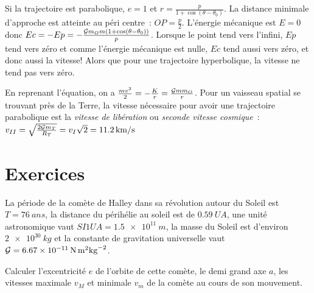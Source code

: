 Si la trajectoire est parabolique, \(e=1\) et \(r =
\frac{p}{1+\cos(\theta-\theta_0)}\). La distance minimale d'approche est %
atteinte au péri centre~: \(OP = \frac{p}{2}\). L'énergie mécanique est \(E=0\)
donc \(Ec = -Ep = -\frac{\mathcal{G} m_O m(1+\cos(\theta - \theta_0))}{p}\). Lorsque le
point tend vers l'infini, \(Ep\) tend vers zéro et comme l'énergie mécanique
est nulle, \(Ec\) tend aussi vers zéro, et donc aussi la vitesse!
Alors que pour une trajectoire hyperbolique, la vitesse ne tend pas vers zéro.

En reprenant l'équation, on a \(\frac{mv^2}{2} = -\frac{K}{r} = \frac{\mathcal{G} m
m_O}{r}\). Pour un vaisseau spatial se trouvant près de la Terre, la vitesse
nécessaire pour avoir une trajectoire parabolique est la \emph{vitesse de
libération} ou \emph{seconde vitesse cosmique}~: \(v_{II} = \sqrt{\frac{2\mathcal{G}
m_T}{R_T}} = v_{I} \sqrt{2} = \qty{11.2}{km/s}\)

\clearpage
\section{Exercices}%
\begin{exercice}%
  La période de la comète de Halley dans sa révolution autour du Soleil est \(T
  = \SI{76}{ans}\), la distance du périhélie au soleil est de
  \(\SI{0.59}{UA}\), une unité astronomique vaut \(SI{1}{UA} =
  \SI{1.5e11}{m}\), la masse du Soleil est d'environ \(\SI{2e30}{kg}\) et la
  constante de gravitation universelle vaut \(\mathcal{G} =
  \SI{6.67e-11}{N.m^2kg^{-2}}\).

  Calculer l'excentricité \(e\) de l'orbite de cette comète, le demi grand axe
  \(a\), les vitesses maximale \(v_M\) et minimale \(v_m\) de la comète au
  cours de son mouvement.
\end{exercice}

